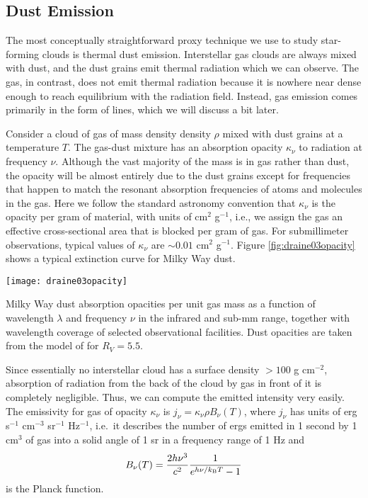 \subsection{Dust Emission}

The most conceptually straightforward proxy technique we use to study star-forming clouds is thermal dust emission. Interstellar gas clouds are always mixed with dust, and the dust grains emit thermal radiation which we can observe. The gas, in contrast, does not emit thermal radiation because it is nowhere near dense enough to reach equilibrium with the radiation field. Instead, gas emission comes primarily in the form of lines, which we will discuss a bit later.
  
Consider a cloud of gas of mass density density $\rho$ mixed with dust grains at a temperature $T$. The gas-dust mixture has an absorption opacity $\kappa_{\nu}$ to radiation at frequency $\nu$. Although the vast majority of the mass is in gas rather than dust, the opacity will be almost entirely due to the dust grains except for frequencies that happen to match the resonant absorption frequencies of atoms and molecules in the gas. Here we follow the standard astronomy convention that $\kappa_{\nu}$ is the opacity per gram of material, with units of cm$^2$ g$^{-1}$, i.e., we assign the gas an effective cross-sectional area that is blocked per gram of gas. For submillimeter observations, typical values of $\kappa_{\nu}$ are $\sim 0.01$ cm$^{2}$ g$^{-1}$. Figure \ref{fig:draine03opacity} shows a typical extinction curve for Milky Way dust.

\begin{marginfigure}
\texttt{[image: draine03opacity]}
\caption[Dust absorption opacity]{
\label{fig:draine03opacity}
Milky Way dust absorption opacities per unit gas mass as a function of wavelength $\lambda$ and frequency $\nu$ in the infrared and sub-mm range, together with wavelength coverage of selected observational facilities. Dust opacities are taken from the model of \citet{draine03a} for $R_V = 5.5$.
}
\end{marginfigure}

Since essentially no interstellar cloud has a surface density $> 100$ g cm$^{-2}$, absorption of radiation from the back of the cloud by gas in front of it is completely negligible. Thus, we can compute the emitted intensity very easily. The emissivity for gas of opacity $\kappa_{\nu}$ is $j_{\nu} = \kappa_{\nu} \rho B_{\nu}(T)$, where $j_{\nu}$ has units of erg s$^{-1}$ cm$^{-3}$ sr$^{-1}$ Hz$^{-1}$, i.e.\ it describes the number of ergs emitted in 1 second by 1 cm$^3$ of gas into a solid angle of 1 sr in a frequency range of 1 Hz and
\begin{equation}
B_{\nu}(T) = \frac{2 h\nu^3}{c^2} \frac{1}{e^{h\nu/k_{\mathrm{B}} T}-1}
\end{equation}
is the Planck function.
  
